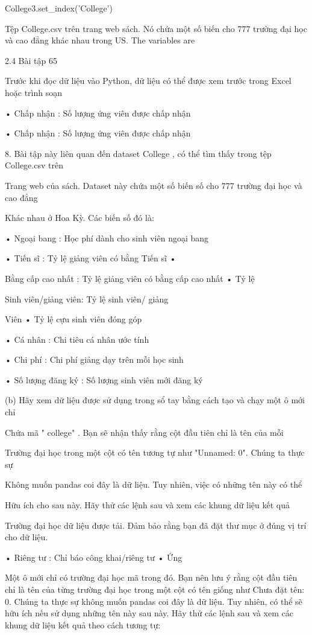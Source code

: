 College3.set\_index('College')

Tệp College.csv trên trang web sách. Nó chứa một số biến cho 777 trường đại học và cao đẳng khác nhau trong US. The variables are

2.4 Bài tập 65

Trước khi đọc dữ liệu vào Python, dữ liệu có thể được xem trước trong Excel hoặc trình soạn

• Chấp nhận : Số lượng ứng viên được chấp nhận

• Chấp nhận : Số lượng ứng viên được chấp nhận

8. Bài tập này liên quan đến dataset College , có thể tìm thấy trong tệp College.csv trên

Trang web của sách. Dataset này chứa một số biến số cho 777 trường đại học và cao đẳng

Khác nhau ở Hoa Kỳ. Các biến số đó là:

• Ngoại bang : Học phí dành cho sinh viên ngoại bang

• Tiến sĩ : Tỷ lệ giảng viên có bằng Tiến sĩ •

Bằng cấp cao nhất : Tỷ lệ giảng viên có bằng cấp cao nhất • Tỷ lệ

Sinh viên/giảng viên: Tỷ lệ sinh viên/ giảng

Viên • Tỷ lệ cựu sinh viên đóng góp

• Cá nhân : Chi tiêu cá nhân ước tính

• Chi phí : Chi phí giảng dạy trên mỗi học sinh

• Số lượng đăng ký : Số lượng sinh viên mới đăng ký

(b) Hãy xem dữ liệu được sử dụng trong sổ tay bằng cách tạo và chạy một ô mới chỉ

Chứa mã " college" . Bạn sẽ nhận thấy rằng cột đầu tiên chỉ là tên của mỗi

Trường đại học trong một cột có tên tương tự như "Unnamed: 0". Chúng ta thực sự

Không muốn pandas coi đây là dữ liệu. Tuy nhiên, việc có những tên này có thể

Hữu ích cho sau này. Hãy thử các lệnh sau và xem các khung dữ liệu kết quả

Trường đại học dữ liệu được tải. Đảm bảo rằng bạn đã đặt thư mục ở đúng vị trí cho dữ liệu.

• Riêng tư : Chỉ báo công khai/riêng tư • Ứng

Một ô mới chỉ có trường đại học mã trong đó. Bạn nên lưu ý rằng cột đầu tiên chỉ là tên của từng trường đại học trong một cột có tên giống như Chưa đặt tên: 0. Chúng ta thực sự không muốn pandas coi đây là dữ liệu. Tuy nhiên, có thể sẽ hữu ích nếu sử dụng những tên này sau này. Hãy thử các lệnh sau và xem các khung dữ liệu kết quả theo cách tương tự:


